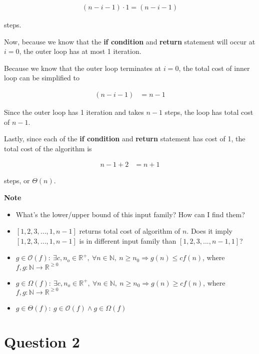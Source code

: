 \documentclass[12pt]{article}
\begin{document}
\begin{enumerate}[a.]
    \begin{align}
        (n-i-1) \cdot 1 = (n-i-1)
    \end{align}

    steps.

    \bigskip

    Now, because we know that the \textbf{if condition} and \textbf{return}
    statement will occur at $i = 0$, the outer loop has at most 1 iteration.

    \bigskip

    Because we know that the outer loop terminates at $i=0$, the total cost of
    inner loop can be simplified to

    \begin{align}
        (n-i-1) &= n-1
    \end{align}

    \bigskip

    Since the outer loop has 1 iteration and takes $n-1$ steps, the loop has
    total cost of $n-1$.

    \bigskip

    Lastly, since each of the \textbf{if condition} and \textbf{return} statement
    has cost of 1, the total cost of the algorithm is

    \begin{align}
        n-1+2 &= n+1
    \end{align}

    steps, or $\Theta(n)$.

    \bigskip

    \textbf{Note}

    \begin{itemize}
        \item
        What's the lower/upper bound of this input family? How can I find them?

        \item $[1,2,3,...,1,n-1]$ returns total cost of algorithm of $n$. Does it
        imply $[1,2,3,...,1,n-1]$ is in different input family than $[1,2,3,...,n-1,1]$?
        \item

        $g \in \mathcal{O}(f):\:\exists c,n_o \in \mathbb{R}^{+},\:\forall n \in
        \mathbb{N},\:n \geq n_0 \Rightarrow g(n) \leq cf(n)$, where $f,g:\mathbb{N} \to \mathbb{R}^{\geq 0}$

        \item

        $g \in \Omega(f):\:\exists c,n_o \in \mathbb{R}^{+},\:\forall n \in
        \mathbb{N},\:n \geq n_0 \Rightarrow g(n) \geq cf(n)$, where $f,g:\mathbb{N} \to \mathbb{R}^{\geq 0}$

        \item

        $g \in \Theta(f):\: g \in \mathcal{O}(f) \land g \in \Omega(f)$
    \end{itemize}

\end{enumerate}

\section*{Question 2}
\end{document}

